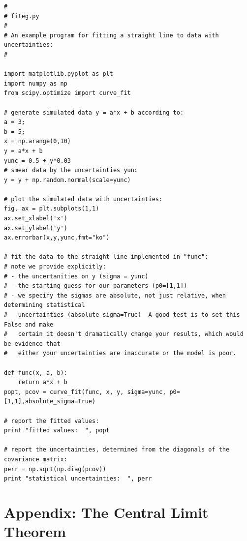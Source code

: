 \documentclass[12pt]{article}
\begin{document}
\begin{verbatim}
#
# fiteg.py
#
# An example program for fitting a straight line to data with uncertainties:
# 

import matplotlib.pyplot as plt
import numpy as np
from scipy.optimize import curve_fit

# generate simulated data y = a*x + b according to:
a = 3;
b = 5;
x = np.arange(0,10)
y = a*x + b
yunc = 0.5 + y*0.03
# smear data by the uncertainties yunc
y = y + np.random.normal(scale=yunc)

# plot the simulated data with uncertainties:
fig, ax = plt.subplots(1,1)
ax.set_xlabel('x')
ax.set_ylabel('y')
ax.errorbar(x,y,yunc,fmt="ko")

# fit the data to the straight line implemented in "func":
# note we provide explicitly:
# - the uncertanities on y (sigma = yunc)
# - the starting guess for our parameters (p0=[1,1])
# - we specify the sigmas are absolute, not just relative, when determining statistical 
#   uncertainties (absolute_sigma=True)  A good test is to set this False and make 
#   certain it doesn't dramatically change your results, which would be evidence that 
#   either your uncertainties are inaccurate or the model is poor.

def func(x, a, b):
    return a*x + b
popt, pcov = curve_fit(func, x, y, sigma=yunc, p0=[1,1],absolute_sigma=True)

# report the fitted values:
print "fitted values:  ", popt

# report the uncertainties, determined from the diagonals of the covariance matrix:
perr = np.sqrt(np.diag(pcov))
print "statistical uncertainties:  ", perr
\end{verbatim}

\section{Appendix:  The Central Limit Theorem}
\end{document}

